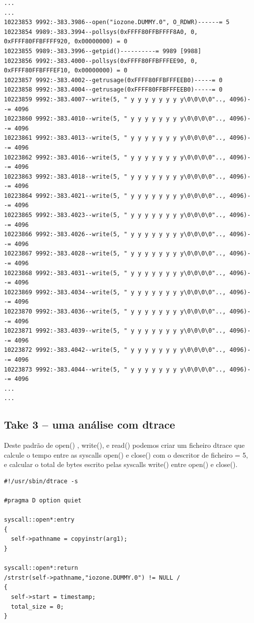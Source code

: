 \documentclass[a4paper]{article}
\begin{document}
{\begin{lstlisting}
...
...
10223853 9992:-383.3986--open("iozone.DUMMY.0", O_RDWR)------= 5
10223854 9989:-383.3994--pollsys(0xFFFF80FFBFFFF8A0, 0, 0xFFFF80FFBFFFF920, 0x00000000) = 0
10223855 9989:-383.3996--getpid()----------= 9989 [9988]
10223856 9992:-383.4000--pollsys(0xFFFF80FFBFFFEE90, 0, 0xFFFF80FFBFFFEF10, 0x00000000) = 0
10223857 9992:-383.4002--getrusage(0xFFFF80FFBFFFEEB0)-----= 0
10223858 9992:-383.4004--getrusage(0xFFFF80FFBFFFEEB0)-----= 0
10223859 9992:-383.4007--write(5, " y y y y y y y y\0\0\0\0".., 4096)--= 4096
10223860 9992:-383.4010--write(5, " y y y y y y y y\0\0\0\0".., 4096)--= 4096
10223861 9992:-383.4013--write(5, " y y y y y y y y\0\0\0\0".., 4096)--= 4096
10223862 9992:-383.4016--write(5, " y y y y y y y y\0\0\0\0".., 4096)--= 4096
10223863 9992:-383.4018--write(5, " y y y y y y y y\0\0\0\0".., 4096)--= 4096
10223864 9992:-383.4021--write(5, " y y y y y y y y\0\0\0\0".., 4096)--= 4096
10223865 9992:-383.4023--write(5, " y y y y y y y y\0\0\0\0".., 4096)--= 4096
10223866 9992:-383.4026--write(5, " y y y y y y y y\0\0\0\0".., 4096)--= 4096
10223867 9992:-383.4028--write(5, " y y y y y y y y\0\0\0\0".., 4096)--= 4096
10223868 9992:-383.4031--write(5, " y y y y y y y y\0\0\0\0".., 4096)--= 4096
10223869 9992:-383.4034--write(5, " y y y y y y y y\0\0\0\0".., 4096)--= 4096
10223870 9992:-383.4036--write(5, " y y y y y y y y\0\0\0\0".., 4096)--= 4096
10223871 9992:-383.4039--write(5, " y y y y y y y y\0\0\0\0".., 4096)--= 4096
10223872 9992:-383.4042--write(5, " y y y y y y y y\0\0\0\0".., 4096)--= 4096
10223873 9992:-383.4044--write(5, " y y y y y y y y\0\0\0\0".., 4096)--= 4096
...
...
\end{lstlisting}
\newpage
\subsection{Take 3 -- uma análise com dtrace}

Deste padrão de open() , write(), e read() podemos criar um ficheiro dtrace que calcule o tempo entre as syscalls open() e close() com o descritor de ficheiro = 5, e calcular o total de bytes escrito pelas syscalls write() entre open() e close().

\begin{lstlisting}
#!/usr/sbin/dtrace -s

#pragma D option quiet

syscall::open*:entry
{
  self->pathname = copyinstr(arg1); 
}

syscall::open*:return
/strstr(self->pathname,"iozone.DUMMY.0") != NULL /
{
  self->start = timestamp; 
  total_size = 0;
}


\end{lstlisting}}
\end{document}
